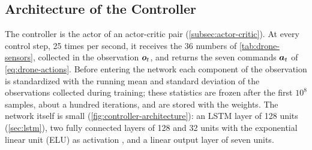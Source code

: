 \subsection{Architecture of the Controller}
\label{subsec:controller-architecture}

The controller is the actor of an actor-critic pair (\autoref{subsec:actor-critic}). At every control step, 25 times per second, it receives the 36 numbers of \autoref{tab:drone-sensors}, collected in the observation $\bm{o}_t$, and returns the seven commands $\bm{a}_t$ of \eqref{eq:drone-actions}. Before entering the network each component of the observation is standardized with the running mean and standard deviation of the observations collected during training; these statistics are frozen after the first $10^8$ samples, about a hundred iterations, and are stored with the weights. The network itself is small (\autoref{fig:controller-architecture}): an LSTM layer of 128 units (\autoref{sec:lstm}), two fully connected layers of 128 and 32 units with the exponential linear unit (ELU) as activation \cite{clevert2016elu}, and a linear output layer of seven units.

